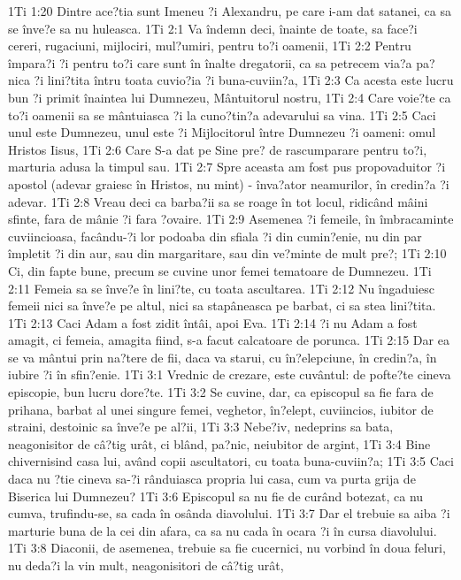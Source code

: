 1Ti 1:20  Dintre ace?tia sunt Imeneu ?i Alexandru, pe care i-am dat satanei, ca sa se înve?e sa nu huleasca.
1Ti 2:1  Va îndemn deci, înainte de toate, sa face?i cereri, rugaciuni, mijlociri, mul?umiri, pentru to?i oamenii,
1Ti 2:2  Pentru împara?i ?i pentru to?i care sunt în înalte dregatorii, ca sa petrecem via?a pa?nica ?i lini?tita întru toata cuvio?ia ?i buna-cuviin?a,
1Ti 2:3  Ca acesta este lucru bun ?i primit înaintea lui Dumnezeu, Mântuitorul nostru,
1Ti 2:4  Care voie?te ca to?i oamenii sa se mântuiasca ?i la cuno?tin?a adevarului sa vina.
1Ti 2:5  Caci unul este Dumnezeu, unul este ?i Mijlocitorul între Dumnezeu ?i oameni: omul Hristos Iisus,
1Ti 2:6  Care S-a dat pe Sine pre? de rascumparare pentru to?i, marturia adusa la timpul sau.
1Ti 2:7  Spre aceasta am fost pus propovaduitor ?i apostol (adevar graiesc în Hristos, nu mint) - înva?ator neamurilor, în credin?a ?i adevar.
1Ti 2:8  Vreau deci ca barba?ii sa se roage în tot locul, ridicând mâini sfinte, fara de mânie ?i fara ?ovaire.
1Ti 2:9  Asemenea ?i femeile, în îmbracaminte cuviincioasa, facându-?i lor podoaba din sfiala ?i din cumin?enie, nu din par împletit ?i din aur, sau din margaritare, sau din ve?minte de mult pre?;
1Ti 2:10  Ci, din fapte bune, precum se cuvine unor femei tematoare de Dumnezeu.
1Ti 2:11  Femeia sa se înve?e în lini?te, cu toata ascultarea.
1Ti 2:12  Nu îngaduiesc femeii nici sa înve?e pe altul, nici sa stapâneasca pe barbat, ci sa stea lini?tita.
1Ti 2:13  Caci Adam a fost zidit întâi, apoi Eva.
1Ti 2:14  ?i nu Adam a fost amagit, ci femeia, amagita fiind, s-a facut calcatoare de porunca.
1Ti 2:15  Dar ea se va mântui prin na?tere de fii, daca va starui, cu în?elepciune, în credin?a, în iubire ?i în sfin?enie.
1Ti 3:1  Vrednic de crezare, este cuvântul: de pofte?te cineva episcopie, bun lucru dore?te.
1Ti 3:2  Se cuvine, dar, ca episcopul sa fie fara de prihana, barbat al unei singure femei, veghetor, în?elept, cuviincios, iubitor de straini, destoinic sa înve?e pe al?ii,
1Ti 3:3  Nebe?iv, nedeprins sa bata, neagonisitor de câ?tig urât, ci blând, pa?nic, neiubitor de argint,
1Ti 3:4  Bine chivernisind casa lui, având copii ascultatori, cu toata buna-cuviin?a;
1Ti 3:5  Caci daca nu ?tie cineva sa-?i rânduiasca propria lui casa, cum va purta grija de Biserica lui Dumnezeu?
1Ti 3:6  Episcopul sa nu fie de curând botezat, ca nu cumva, trufindu-se, sa cada în osânda diavolului.
1Ti 3:7  Dar el trebuie sa aiba ?i marturie buna de la cei din afara, ca sa nu cada în ocara ?i în cursa diavolului.
1Ti 3:8  Diaconii, de asemenea, trebuie sa fie cucernici, nu vorbind în doua feluri, nu deda?i la vin mult, neagonisitori de câ?tig urât,
